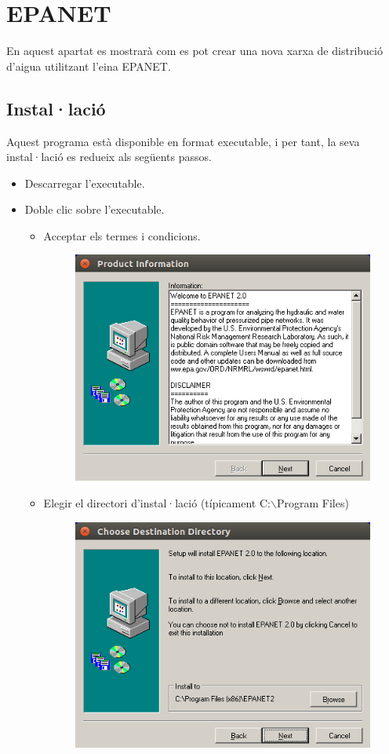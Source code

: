 \documentclass[12pt]{article}
\begin{document}
\pagebreak
\clearpage
\section{EPANET}
En aquest apartat es mostrarà com es pot crear una nova xarxa de distribució d'aigua utilitzant l'eina EPANET.
\subsection{Instal·lació}
Aquest programa està disponible en format executable, i per tant, la seva instal·lació es redueix als següents passos.
\begin{itemize}
	\item Descarregar l'executable.
	\item Doble clic sobre l'executable.
	\begin{itemize}
		\item Acceptar els termes i condicions.
		\begin{figure}[h!]
			\centering
			\includegraphics[scale=.3]{imatges/epanet/inst/1.png}
		\end{figure}
		\item Elegir el directori d'instal·lació (típicament C:$\backslash$Program Files)
		\begin{figure}[h!]
			\centering
			\includegraphics[scale=.3]{imatges/epanet/inst/2.png}

\end{figure}
\end{itemize}
\end{itemize}
\end{document}
